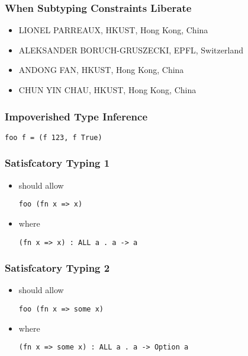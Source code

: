 \documentclass{beamer}
\begin{document}

\begin{frame}
  \frametitle{When Subtyping Constraints Liberate}

  \begin{itemize}
  \item LIONEL PARREAUX, HKUST, Hong Kong, China
  \item ALEKSANDER BORUCH-GRUSZECKI, EPFL, Switzerland
  \item ANDONG FAN, HKUST, Hong Kong, China
  \item CHUN YIN CHAU, HKUST, Hong Kong, China
  \end{itemize}
\end{frame}

\begin{frame}[fragile]
  \frametitle{Impoverished Type Inference}

  \begin{lstlisting}
foo f = (f 123, f True)
  \end{lstlisting}

\end{frame}


\begin{frame}[fragile]
  \frametitle{Satisfcatory Typing 1}

  \begin{itemize}
  \item should allow
  \begin{lstlisting}
foo (fn x => x)
  \end{lstlisting}
  \item where
  \begin{lstlisting}
(fn x => x) : ALL a . a -> a
  \end{lstlisting}
  \end{itemize}

\end{frame}


\begin{frame}[fragile]
  \frametitle{Satisfcatory Typing 2}

  \begin{itemize}
  \item should allow
  \begin{lstlisting}
foo (fn x => some x)
  \end{lstlisting}
  \item where
  \begin{lstlisting}
(fn x => some x) : ALL a . a -> Option a
  \end{lstlisting}
  \end{itemize}

\end{frame}
\end{document}
